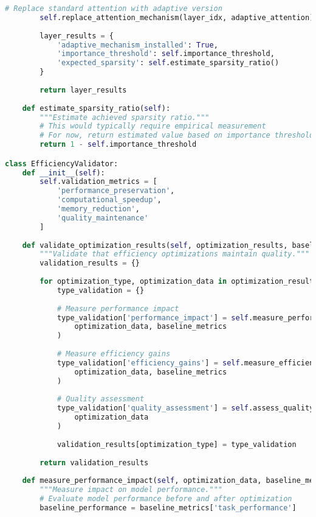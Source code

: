 \begin{lstlisting}[language=Python, caption=Comprehensive computational efficiency optimization framework]
        # Replace standard attention with adaptive version
        self.replace_attention_mechanism(layer_idx, adaptive_attention)
        
        layer_results = {
            'adaptive_mechanism_installed': True,
            'importance_threshold': self.importance_threshold,
            'expected_sparsity': self.estimate_sparsity_ratio()
        }
        
        return layer_results
    
    def estimate_sparsity_ratio(self):
        """Estimate achieved sparsity ratio."""
        # This would typically require empirical measurement
        # For now, return estimated value based on importance threshold
        return 1 - self.importance_threshold

class EfficiencyValidator:
    def __init__(self):
        self.validation_metrics = [
            'performance_preservation',
            'computational_speedup', 
            'memory_reduction',
            'quality_maintenance'
        ]
    
    def validate_optimization_results(self, optimization_results, baseline_metrics):
        """Validate that efficiency optimizations maintain quality."""
        validation_results = {}
        
        for optimization_type, optimization_data in optimization_results.items():
            type_validation = {}
            
            # Measure performance impact
            type_validation['performance_impact'] = self.measure_performance_impact(
                optimization_data, baseline_metrics
            )
            
            # Measure efficiency gains
            type_validation['efficiency_gains'] = self.measure_efficiency_gains(
                optimization_data, baseline_metrics
            )
            
            # Quality assessment
            type_validation['quality_assessment'] = self.assess_quality_preservation(
                optimization_data
            )
            
            validation_results[optimization_type] = type_validation
        
        return validation_results
    
    def measure_performance_impact(self, optimization_data, baseline_metrics):
        """Measure impact on model performance."""
        # Evaluate model performance before and after optimization
        baseline_performance = baseline_metrics['task_performance']
        

\end{lstlisting}
